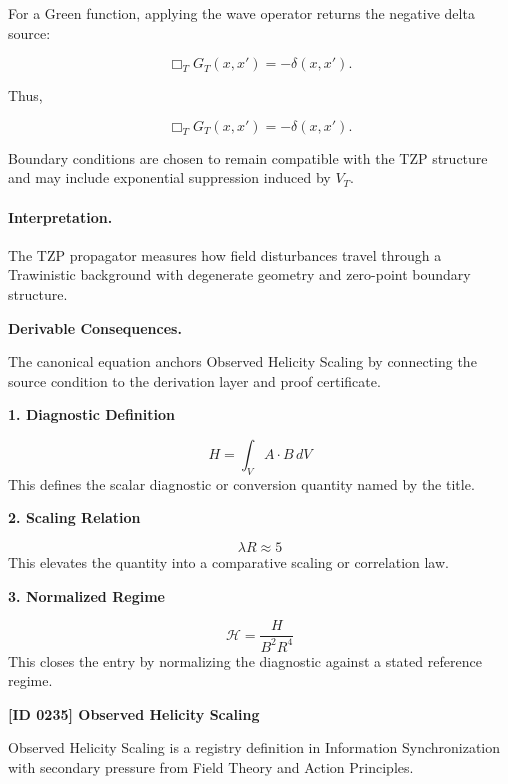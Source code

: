 For a Green function, applying the wave operator returns the negative delta source:

\begin{equation}
\Box_T G_T(x,x')
=
-\delta(x,x') .
\end{equation}

Thus,

\begin{equation}
\boxed{
\Box_T G_T(x,x')
=
-\delta(x,x') .
}
\end{equation}

Boundary conditions are chosen to remain compatible with the TZP structure and may include exponential suppression induced by $V_T$.

\paragraph{Interpretation.}
The TZP propagator measures how field disturbances travel through a Trawinistic background with degenerate geometry and zero-point boundary structure.

\par\vspace{0.35em}
\noindent\textbf{Derivable Consequences.}\quad
\begingroup
\footnotesize
\raggedright
The canonical equation anchors Observed Helicity Scaling by connecting the source condition to the derivation layer and proof certificate.
\par\endgroup

\noindent\textbf{1. Diagnostic Definition}\par
\[
H=\int_V A\cdot B\,dV
\]
\noindent This defines the scalar diagnostic or conversion quantity named by the title.\par
\noindent\textbf{2. Scaling Relation}\par
\[
\lambda R\approx 5
\]
\noindent This elevates the quantity into a comparative scaling or correlation law.\par
\noindent\textbf{3. Normalized Regime}\par
\[
\mathcal{H}=\frac{H}{B^2R^4}
\]
\noindent This closes the entry by normalizing the diagnostic against a stated reference regime.\par

\clearpage
\noindent\textbf{[ID 0235] Observed Helicity Scaling}\par
\vspace{0.35em}
\begingroup\small
{}
Observed Helicity Scaling is a registry definition in Information Synchronization with secondary pressure from Field Theory and Action Principles.

